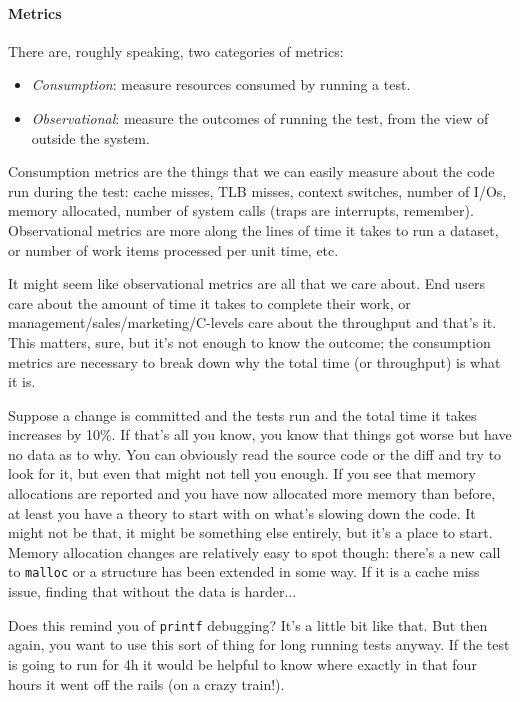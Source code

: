 \paragraph{Metrics} There are, roughly speaking, two categories of metrics:

\begin{itemize}
	\item \textit{Consumption}: measure resources consumed by running a test.
	\item \textit{Observational}: measure the outcomes of running the test, from the view of outside the system.
\end{itemize}

Consumption metrics are the things that we can easily measure about the code run during the test: cache misses, TLB misses, context switches, number of I/Os, memory allocated, number of system calls (traps are interrupts, remember). Observational metrics are more along the lines of time it takes to run a dataset, or number of work items processed per unit time, etc.

It might seem like observational metrics are all that we care about. End users care about the amount of time it takes to complete their work, or management/sales/marketing/C-levels care about the throughput and that's it. This matters, sure, but it's not enough to know the outcome; the consumption metrics are necessary to break down why the total time (or throughput) is what it is.

Suppose a change is committed and the tests run and the total time it takes increases by 10\%. If that's all you know, you know that things got worse but have no data as to why. You can obviously read the source code or the diff and try to look for it, but even that might not tell you enough. If you see that memory allocations are reported and you have now allocated more memory than before,  at least you have a theory to start with on what's slowing down the code. It might not be that, it might be something else entirely, but it's a place to start. Memory allocation changes are relatively easy to spot though: there's a new call to \texttt{malloc} or a structure has been extended in some way. If it is a cache miss issue, finding that without the data is harder...

Does this remind you of \texttt{printf} debugging? It's a little bit like that. But then again, you want to use this sort of thing for long running tests anyway. If the test is going to run for 4h it would be helpful to know where exactly in that four hours it went off the rails (on a crazy train!). 

